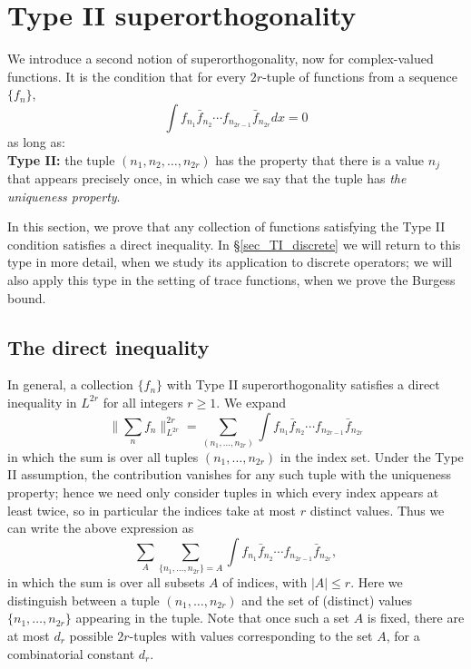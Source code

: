\documentclass[oneside,11pt]{amsart}
\begin{document}
\section{Type II superorthogonality}\label{sec_TypeII}
We introduce a second notion of superorthogonality, now for complex-valued functions.    It is the condition that for every $2r$-tuple of functions from a sequence $\{f_n\}$,
\[  \int f_{n_1}\bar{f}_{n_2} \cdots f_{n_{2r-1}} \bar{f}_{n_{2r}} dx =0 \]
as long as:\\
{\bf Type II:}  the tuple $(n_1,n_2,\ldots, n_{2r})$ has the property that there is a value $n_j$ that appears precisely once, in which case we say that the tuple has \emph{the uniqueness property}.

In this section, we prove that any collection of functions satisfying the Type II condition satisfies a direct inequality. In \S \ref{sec_TI_discrete} we will return to this type in more detail, when we study its application to discrete operators; we will also apply this type in the setting of trace functions, when we prove the Burgess bound. 
  
  


 
\subsection{The direct inequality}\label{sec_TI_direct}

In general, a collection $\{f_n\}$ with Type II superorthogonality  satisfies a direct inequality   in $L^{2r}$ for all integers $r \geq 1$.
We expand 
\[
 \| \sum_{n} f_n \|_{L^{2r}}^{2r} = \sum_{(n_1,\ldots, n_{2r})} \int f_{n_1} \bar{f}_{n_2} \cdots f_{n_{2r-1}} \bar{f}_{n_{2r}}  
\]
in which the sum is over all tuples $(n_1, \ldots, n_{2r})$ in the index set. Under the Type II assumption, the contribution vanishes for any such tuple with the uniqueness property; hence we need only consider tuples in which every index appears at least twice, so in particular the indices take at most $r$ distinct values. Thus we can write the above expression as 
\[ \sum_{A} \sum_{\{n_1,\ldots, n_{2r}\} = A} \int f_{n_1}  \bar{f}_{n_2} \cdots f_{n_{2r-1}}\bar{f}_{n_{2r}}  ,\]
in which the sum is over all subsets $A$  of indices, with $|A| \leq r$. Here we distinguish between a tuple $(n_1,\ldots, n_{2r})$ and the set of (distinct) values $\{n_1,\ldots, n_{2r}\}$ appearing in the tuple. Note that once such a set $A$ is fixed, there are at most $d_r$ possible $2r$-tuples   with values corresponding to the set $A$, for a combinatorial constant $d_r$. 
\end{document}
